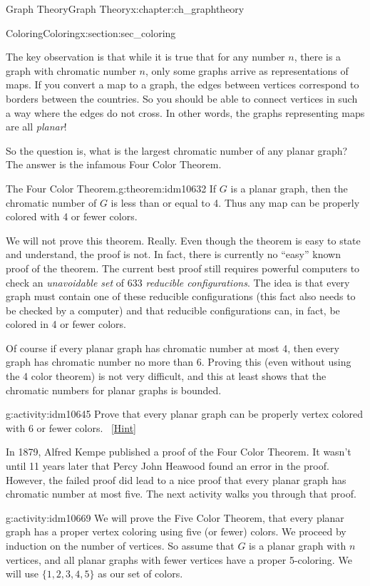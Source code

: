 \documentclass[oneside,10pt,]{book}
\numberwithin{equation}{chapter}
\begin{document}
\begin{chapterptx}{Graph Theory}{}{Graph Theory}{}{}{x:chapter:ch_graphtheory}
\begin{sectionptx}{Coloring}{}{Coloring}{}{}{x:section:sec_coloring}
\begin{introduction}{}
\par
The key observation is that while it is true that for any number \(n\), there is a graph with chromatic number \(n\), only some graphs arrive as representations of maps. If you convert a map to a graph, the edges between vertices correspond to borders between the countries. So you should be able to connect vertices in such a way where the edges do not cross. In other words, the graphs representing maps are all \emph{planar}!%
\par
So the question is, what is the largest chromatic number of any planar graph? The answer is the infamous Four Color Theorem.%
\begin{theorem}{The Four Color Theorem.}{}{g:theorem:idm10632}%
 If \(G\) is a planar graph, then the chromatic number of \(G\) is less than or equal to 4. Thus any map can be properly colored with 4 or fewer colors.%
\end{theorem}
We will not prove this theorem. Really. Even though the theorem is easy to state and understand, the proof is not. In fact, there is currently no ``easy'' known proof of the theorem. The current best proof still requires powerful computers to check an \emph{unavoidable set} of 633 \emph{reducible configurations}. The idea is that every graph must contain one of these reducible configurations (this fact also needs to be checked by a computer) and that reducible configurations can, in fact, be colored in 4 or fewer colors.%
\par
Of course if every planar graph has chromatic number at most 4, then every graph has chromatic number no more than 6.  Proving this (even without using the 4 color theorem) is not very difficult, and this at least shows that the chromatic numbers for planar graphs is bounded.%
\begin{activity}{}{g:activity:idm10645}%
Prove that every planar graph can be properly vertex colored with 6 or fewer colors.%
\qquad~\hfill{\tiny\hyperlink{g:hint:idm10648-back}{[Hint]}}\end{activity}
In 1879, Alfred Kempe published a proof of the Four Color Theorem.  It wasn't until 11 years later that Percy John Heawood found an error in the proof.  However, the failed proof did lead to a nice proof that every planar graph has chromatic number at most five.  The next activity walks you through that proof.%
\begin{activity}{}{g:activity:idm10669}%
We will prove the Five Color Theorem, that every planar graph has a proper vertex coloring using five (or fewer) colors.  We proceed by induction on the number of vertices.  So assume that \(G\) is a planar graph with \(n\) vertices, and all planar graphs with fewer vertices have a proper 5-coloring.  We will use \(\{1,2,3,4,5\}\) as our set of colors.%

\end{activity}
\end{introduction}
\end{sectionptx}
\end{chapterptx}
\end{document}
